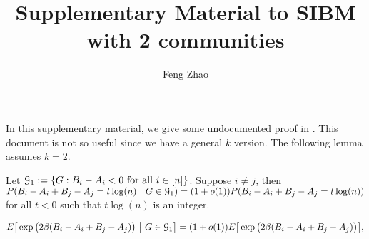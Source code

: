 \documentclass{article}
\title{Supplementary Material to SIBM with 2 communities}
\author{Feng Zhao}
\begin{document}
\maketitle
In this supplementary material, we give some undocumented proof in \cite{ye2020exact}.
This document is not so useful since we have a general $k$ version. The following lemma assumes $k=2$.
\begin{lemma}\label{lem:ucBA}
Let $\mathcal{G}_1:=\{G:B_i-A_i<0\text{~for all~}i\in[n]\}$. Suppose $i\neq j$, then $P(B_i-A_i + B_j - A_j= t\log(n)~|~G\in\mathcal{G}_1)= (1+o(1))P(B_i-A_i + B_j - A_j= t\log(n))$ for all $t<0$ such that $t\log(n)$ is an integer.
\end{lemma}
\begin{lemma}\label{lem:BijG}
\begin{equation} 
E \big[  \exp\big(2\beta (B_i-A_i + B_j - A_j) \big) ~\big|~ G\in\mathcal{G}_1 \big] 
= (1+o(1)) E \big[  \exp\big(2\beta (B_i-A_i + B_j - A_j) \big) \big] ,
\end{equation}
\end{lemma}
\end{document}
